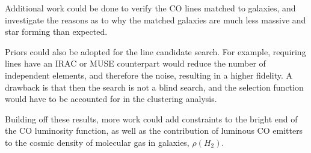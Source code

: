 \documentclass[twoside,single]{lion-msc}
\begin{document}
Additional work could be done to verify the CO lines matched to galaxies, and investigate the reasons as to why the matched galaxies are much less massive and star forming than expected.

Priors could also be adopted for the line candidate search. For example, requiring lines have an IRAC or MUSE counterpart would reduce the number of independent elements, and therefore the noise, resulting in a higher fidelity. A drawback is that then the search is not a blind search, and the selection function would have to be accounted for in the clustering analysis.

Building off these results, more work could add constraints to the bright end of the CO luminosity function, as well as the contribution of luminous CO emitters to the cosmic density of molecular gas in galaxies, $\rho(H_2)$.

\appendix




\end{document}

